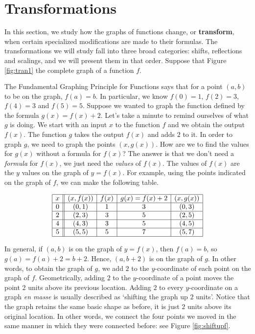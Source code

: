 
\section{Transformations}
\label{Transformations}

In this section, we study how the graphs of functions change, or \textbf{transform}, when certain specialized modifications are made to their formulas. The transformations we will study fall into three broad categories:  shifts, reflections and scalings, and we will present them in that order.  Suppose that Figure \ref{fig:tran1} the complete graph of a function $f$.



The Fundamental Graphing Principle for Functions says that for a point $(a,b)$ to be on the graph, $f(a) = b$.  In particular, we know $f(0) = 1$, $f(2)=3$, $f(4)=3$ and $f(5)=5$.  Suppose we wanted to graph the function defined by the formula $g(x) = f(x) + 2$.  Let's take a minute to remind ourselves of what $g$ is doing.  We start with an input $x$ to the function $f$ and we obtain the output $f(x)$.  The function $g$ takes the output $f(x)$ and adds $2$ to it.  In order to graph $g$, we need to graph the points $(x,g(x))$.  How are we to find the values for $g(x)$ without a formula for $f(x)$?  The answer is that we don't need a \textit{formula} for $f(x)$, we just need the \textit{values} of $f(x)$.  The values of $f(x)$ are the $y$ values on the graph of $y=f(x)$.  For example, using the points indicated on the graph of $f$, we can make the following table.

\[ \begin{array}{|c||c|c|c|c|}  

\hline

 x & (x,f(x)) & f(x) & g(x)=f(x)+2 & (x, g(x)) \\ \hline
0  & (0,1)& 1 & 3 &(0, 3) \\  \hline
2 & (2,3) & 3 &  5 &(2,5) \\  \hline
4 & (4,3) & 3 &  5 &(4, 5) \\  \hline
5 & (5,5) & 5 &  7 &( 5 ,7) \\  \hline

\end{array} \] 

\smallskip

In general, if $(a,b)$ is on the graph of $y=f(x)$, then $f(a) = b$, so $g(a) = f(a) +2 = b+2$.  Hence, $(a,b+2)$ is on the graph of $g$. In other words, to obtain the graph of $g$, we add $2$ to the $y$-coordinate of each point on the graph of $f$.  Geometrically, adding $2$ to the $y$-coordinate of a point moves the point $2$ units above its previous location.  Adding $2$ to every $y$-coordinate on a graph \textit{en masse} is usually described as `shifting the graph up $2$ units'.  Notice that the graph retains the same basic shape as before, it is just $2$ units above its original location.  In other words, we connect the four points we moved in the same manner in which they were connected before: see Figure \ref{fig:shiftupf}.


